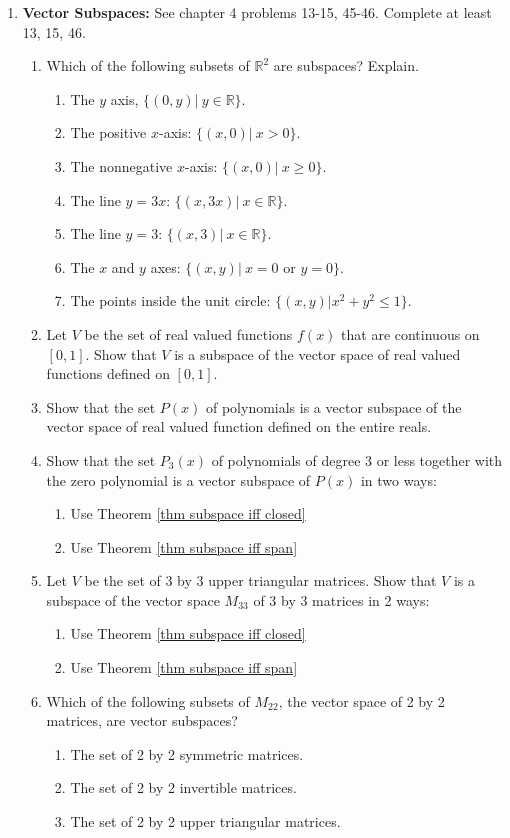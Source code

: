 \begin{enumerate}
\begin{enumerate}
\end{enumerate}

\item \textbf{Vector Subspaces:}  \label{subspace problems}
See chapter 4 problems 13-15, 45-46. Complete at least 13, 15, 46.

\begin{enumerate}
	\item Which of the following subsets of $\mathbb{R}^2$ are subspaces?  Explain.
		\begin{enumerate}
			\item The $y$ axis, $\{(0,y)|\ y\in \mathbb{R}\}$.
			\item The positive $x$-axis: $\{(x,0)|\ x>0\}$.
			\item The nonnegative $x$-axis: $\{(x,0)|\ x\geq 0\}$.
			\item The line $y=3x$: $\{(x,3x)|\ x\in \mathbb{R}\}$.
			\item The line $y=3$: $\{(x,3)|\ x\in \mathbb{R}\}$.
			\item The $x$ and $y$ axes: $\{(x,y)|\ x=0 \text{ or } y=0\}$.
			\item The points inside the unit circle: $\{(x,y)|x^2+y^2\leq 1\}$.
		\end{enumerate}
	\item Let $V$ be the set of real valued functions $f(x)$ that are continuous on $[0,1]$. Show that $V$ is a subspace of the vector space of real valued functions defined on $[0,1]$. 
	\item Show that the set $P(x)$ of polynomials is a vector subspace of the vector space of real valued function defined on the entire reals.
	\item Show that the set $P_3(x)$ of polynomials of degree 3 or less together with the zero polynomial is a vector subspace of $P(x)$ in two ways:
\begin{enumerate}
	\item Use Theorem \ref{thm subspace iff closed}
	\item Use Theorem \ref{thm subspace iff span}
\end{enumerate}
	\item Let $V$ be the set of 3 by 3 upper triangular matrices.  Show that $V$ is a subspace of the vector space $M_{33}$ of 3 by 3 matrices in 2 ways:
\begin{enumerate}
	\item Use Theorem \ref{thm subspace iff closed}
	\item Use Theorem \ref{thm subspace iff span}
\end{enumerate}
	\item Which of the following subsets of $M_{22}$, the vector space of 2 by 2 matrices, are vector subspaces?
		\begin{enumerate}
			\item The set of 2 by 2 symmetric matrices.
			\item The set of 2 by 2 invertible matrices.
			\item The set of 2 by 2 upper triangular matrices.
		\end{enumerate}


\end{enumerate}
\end{enumerate}
